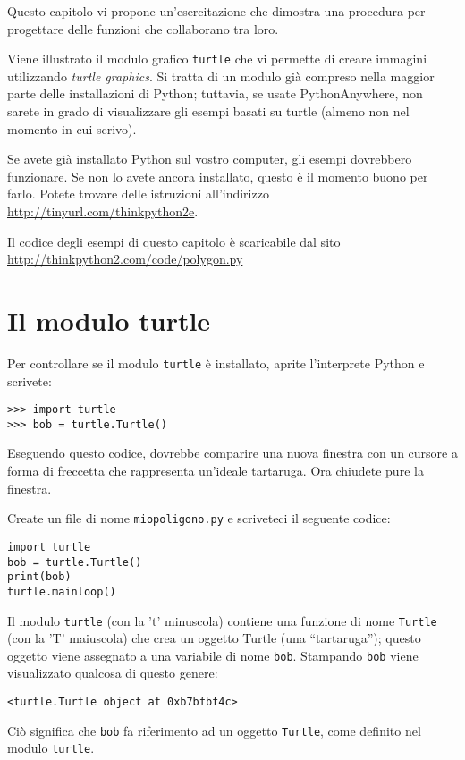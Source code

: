 \documentclass[10pt]{book}
\begin{document}
Questo capitolo vi propone un'esercitazione che dimostra una procedura per progettare delle funzioni che collaborano tra loro.

Viene illustrato il modulo grafico {\tt turtle} che vi permette di creare immagini utilizzando {\em turtle graphics}.  Si tratta di un modulo già compreso nella maggior parte delle installazioni di Python; tuttavia, se usate PythonAnywhere, non sarete in grado di visualizzare gli esempi basati su turtle (almeno non nel momento in cui scrivo).

Se avete già installato Python sul vostro computer, gli esempi dovrebbero funzionare. Se non lo avete ancora installato, questo è il momento buono per farlo. Potete trovare delle istruzioni all'indirizzo \url{http://tinyurl.com/thinkpython2e}.

Il codice degli esempi di questo capitolo è scaricabile dal sito
\url{http://thinkpython2.com/code/polygon.py}


\section{Il modulo turtle}
\label{turtle}

Per controllare se il modulo {\tt turtle} è installato, aprite l'interprete Python e scrivete:

\begin{verbatim}
>>> import turtle
>>> bob = turtle.Turtle()
\end{verbatim}

Eseguendo questo codice, dovrebbe comparire una nuova finestra con un cursore a forma di freccetta che rappresenta un'ideale tartaruga. Ora chiudete pure la finestra.

Create un file di nome {\tt miopoligono.py} e scriveteci il seguente codice:

\begin{verbatim}
import turtle
bob = turtle.Turtle()
print(bob)
turtle.mainloop()
\end{verbatim}
%
Il modulo {\tt turtle} (con la 't' minuscola) contiene una funzione di nome {\tt Turtle} (con la 'T' maiuscola) che crea un oggetto Turtle (una ``tartaruga''); questo oggetto viene assegnato a una variabile di nome {\tt bob}.
Stampando {\tt bob} viene visualizzato qualcosa di questo genere:

\begin{verbatim}
<turtle.Turtle object at 0xb7bfbf4c>
\end{verbatim}
%
Ciò significa che {\tt bob} fa riferimento ad un oggetto {\tt Turtle},
come definito nel modulo {\tt turtle}.
\end{document}
